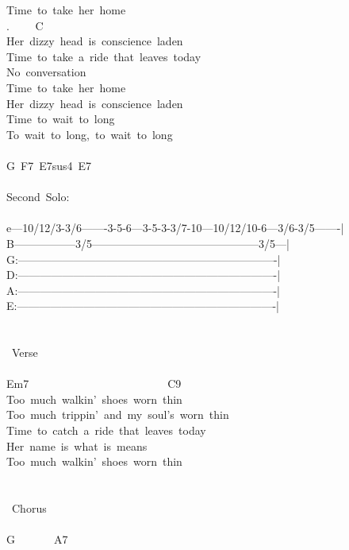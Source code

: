 {Time\ to\ take\ her\ home\\
. \ \ \ \ C\ \ \ \ \ \ \ \ \ \ \ \ \ \ \ \ \ \ \ \ \ \ \ \ \ \ \ \ \ \ \ \\
Her\ dizzy\ head\ is\ conscience\ laden\\
Time\ to\ take\ a\ ride\ that\ leaves\ today\\
No\ conversation\\
Time\ to\ take\ her\ home\\
Her\ dizzy\ head\ is\ conscience\ laden\\
Time\ to\ wait\ to\ long\\
To\ wait\ to\ long,\ to\ wait\ to\ long\\
\\
G\ F7\ E7sus4\ E7\\
\\
Second\ Solo:\\
\\
e---10/12/3-3/6-------3-5-6---3-5-3-3/7-10---10/12/10-6---3/6-3/5-------|\\
B-----------------3/5---------------------------------------------3/5---|\\
G:----------------------------------------------------------------------|\\
D:----------------------------------------------------------------------|\\
A:----------------------------------------------------------------------|\\
E:----------------------------------------------------------------------|\\
\\
\\
\lbrack\ Verse\rbrack\\
\\
Em7\ \ \ \ \ \ \ \ \ \ \ \ \ \ \ \ \ \ \ \ \ \ \ \ \ C9\\
Too\ much\ walkin'\ shoes\ worn\ thin\\
Too\ much\ trippin'\ and\ my\ soul's\ worn\ thin\\
Time\ to\ catch\ a\ ride\ that\ leaves\ today\\
Her\ name\ is\ what\ is\ means\\
Too\ much\ walkin'\ shoes\ worn\ thin\\
\\
\\
\lbrack\ Chorus\rbrack\\
\\
G\ \ \ \ \ \ \ A7\ \ \ \ \ \ \ \\
}
